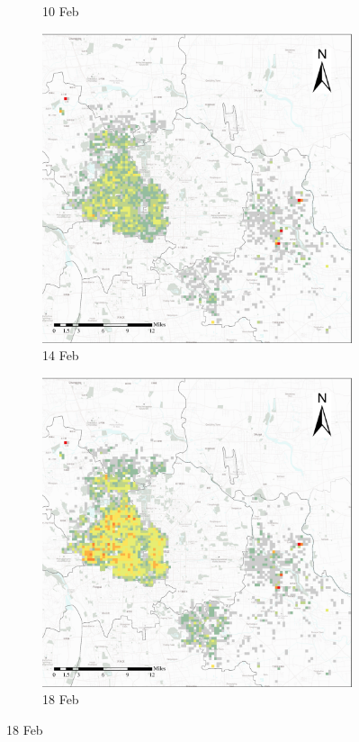 \documentclass[preprints,ijgi,submit,moreauthors]{Definitions/mdpi}
\begin{document}
\begin{figure}[H]
\begin{subfigure}{.23\textwidth}
        \caption{10 Feb}
    \end{subfigure}
    \begin{subfigure}{.23\textwidth}
        \includegraphics[width=\textwidth]{Figures/Overall_spatial_patterns/FN5_D2020_02_14.eps}
        \caption{14 Feb}
    \end{subfigure}
        \begin{subfigure}{.23\textwidth}
        \includegraphics[width=\textwidth]{Figures/Overall_spatial_patterns/FN5_D2020_02_18.eps}
        \caption{18 Feb}
    \end{subfigure}
    

\end{figure}
\end{document}
